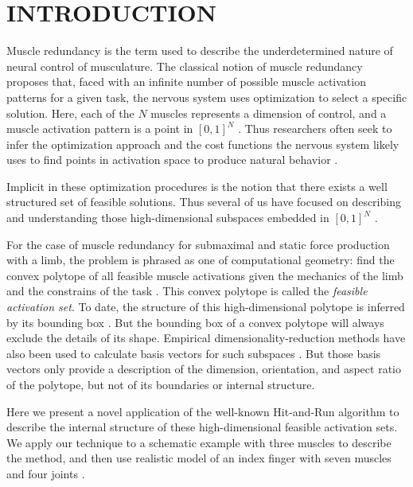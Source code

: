 
\section{INTRODUCTION}

Muscle redundancy is the term used to describe the underdetermined nature of neural control of musculature.
The classical notion of muscle redundancy  proposes that, faced with an infinite number of possible muscle activation patterns for a given task, the nervous system uses optimization to select a specific solution.
Here, each of the $N$ muscles represents a dimension of control, and a muscle activation pattern is a point in $[0,1]^N$ \cite{Valero-Cuevas1998Large}.
Thus researchers often seek to infer the optimization approach and the cost functions the nervous system likely uses to find points in activation space to produce natural behavior \cite{Chao1978Graphical,Prilutsky2000Muscle,scott2004optimal,todorov2002optimal,crowninshield1981physiologically,higginson2005simulated}. 


Implicit in these optimization procedures is the notion that there exists a well structured set of feasible solutions. Thus several of us have focused on describing and understanding those high-dimensional subspaces  embedded in $[0,1]^N$ \cite{kutch2011muscle,kutch2012challenges,sohn2013cat_bounding_box,Valero-Cuevas1998Large,Valero-Cuevas2015high-dimensional}.

For the case of muscle redundancy for submaximal and static force production with a limb,  the problem is phrased as one of computational geometry: find the convex polytope of all feasible muscle activations given the mechanics of the limb and the constrains of the task \cite{avis1992Pivoting,Valero-Cuevas1998Large,Valero-Cuevas2009mathematical,Valero-Cuevas2015high-dimensional}.
This convex polytope is called the \emph{feasible activation set}.
To date, the structure of this high-dimensional polytope is inferred by its bounding box  \cite{kutch2011muscle,sohn2013cat_bounding_box,Valero-Cuevas2015high-dimensional}.
But the bounding box of a convex polytope will always exclude the details of its shape.
Empirical dimensionality-reduction methods have also been used to calculate basis vectors for such subspaces \cite{Clewley2008Estimating,davella2005shared,krishnamoorthy2003muscle}.
But those basis vectors only provide a description of the dimension, orientation, and aspect ratio of the polytope, but not of its boundaries or internal  structure.

Here we present a novel application of the well-known Hit-and-Run algorithm \cite{smith1984efficient} to describe the internal structure of these high-dimensional feasible activation sets. We apply our technique to a schematic example with three muscles to describe the method, and then use realistic model of an index finger with seven muscles and four joints \cite{Valero-Cuevas1998Large}.